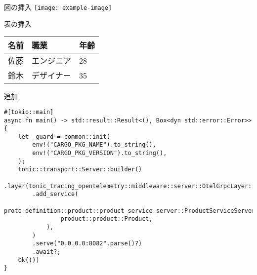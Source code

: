 \documentclass[aspectratio=169]{beamer}
\begin{document}
\begin{frame}{図の挿入}
    \texttt{[image: example-image]}
\end{frame}

\begin{frame}{表の挿入}
    \begin{tabular}{lll}
        \toprule
        名前 & 職業    & 年齢 \\
        \midrule
        佐藤 & エンジニア & 28 \\
        鈴木 & デザイナー & 35 \\
        \bottomrule
    \end{tabular}
\end{frame}

\begin{frame}[fragile]{追加}
    \begin{lstlisting}
#[tokio::main]
async fn main() -> std::result::Result<(), Box<dyn std::error::Error>> {
    let _guard = common::init(
        env!("CARGO_PKG_NAME").to_string(),
        env!("CARGO_PKG_VERSION").to_string(),
    );
    tonic::transport::Server::builder()
        .layer(tonic_tracing_opentelemetry::middleware::server::OtelGrpcLayer::default())
        .add_service(
            proto_definition::product::product_service_server::ProductServiceServer::new(
                product::product::Product,
            ),
        )
        .serve("0.0.0.0:8082".parse()?)
        .await?;
    Ok(())
}
    \end{lstlisting}
\end{frame}
\end{document}
